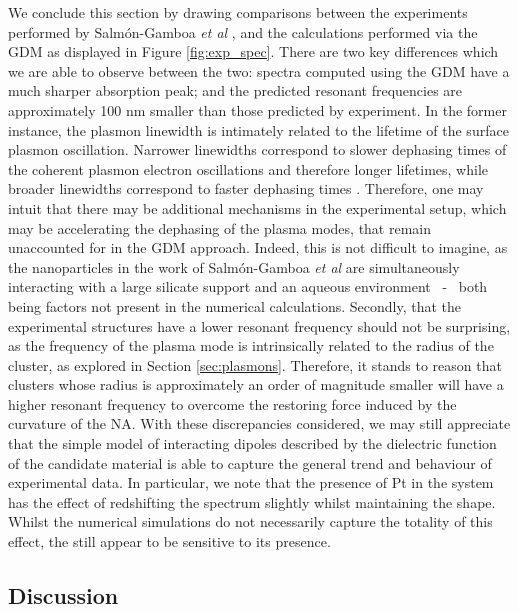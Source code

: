 We conclude this section by drawing comparisons between the experiments performed by Salm{\'o}n-Gamboa \textit{et al} \cite{Jorge2019}, and the calculations performed via the GDM as displayed in Figure \ref{fig:exp_spec}. There are two key differences which we are able to observe between the two: spectra computed using the GDM have a much sharper absorption peak; and the predicted resonant frequencies are approximately 100 nm smaller than those predicted by experiment. In the former instance, the plasmon linewidth is intimately related to the lifetime of the surface plasmon oscillation. Narrower linewidths correspond to slower dephasing times of the coherent plasmon electron oscillations and therefore longer lifetimes, while broader linewidths correspond to faster dephasing times \cite{doi:10.1021/cr1002547}. Therefore, one may intuit that there may be additional mechanisms in the experimental setup, which may be accelerating the dephasing of the plasma modes, that remain unaccounted for in the GDM approach. Indeed, this is not difficult to imagine, as the nanoparticles in the work of Salm{\'o}n-Gamboa \textit{et al} \cite{Jorge2019} are simultaneously interacting with a large silicate support and an aqueous environment ~-~ both being factors not present in the numerical calculations. Secondly, that the experimental structures have a lower resonant frequency should not be surprising, as the frequency of the plasma mode is intrinsically related to the radius of the cluster, as explored in Section \ref{sec:plasmons}. Therefore, it stands to reason that clusters whose radius is approximately an order of magnitude smaller will have a higher resonant frequency to overcome the restoring force induced by the curvature of the NA. With these discrepancies considered, we may still appreciate that the simple model of interacting dipoles described by the dielectric function of the candidate material is able to capture the general trend and behaviour of experimental data. In particular, we note that the presence of Pt in the system has the effect of redshifting the spectrum slightly whilst maintaining the shape. Whilst the numerical simulations do not necessarily capture the totality of this effect, the still appear to be sensitive to its presence. 

\subsection{Discussion}

